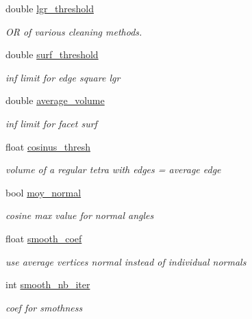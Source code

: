 \begin{DoxyCompactItemize}
\item 
double \hyperlink{classTrParams_a72377e94872cb7e3ec1bc7936d51dfda}{lgr\_\-threshold}
\begin{DoxyCompactList}\small\item\em OR of various cleaning methods. \item\end{DoxyCompactList}\item 
double \hyperlink{classTrParams_a3c2580990cc2a87aa9fb1d8f495eae84}{surf\_\-threshold}
\begin{DoxyCompactList}\small\item\em inf limit for edge square lgr \item\end{DoxyCompactList}\item 
double \hyperlink{classTrParams_a2e9a95d7e585f11e9574ad6b4863ed79}{average\_\-volume}
\begin{DoxyCompactList}\small\item\em inf limit for facet surf \item\end{DoxyCompactList}\item 
float \hyperlink{classTrParams_a91f70ade0efc499e3d55bfb2143d35c6}{cosinus\_\-thresh}
\begin{DoxyCompactList}\small\item\em volume of a regular tetra with edges = average edge \item\end{DoxyCompactList}\item 
bool \hyperlink{classTrParams_a2ba40154349c0c124ca933439d0575b3}{moy\_\-normal}
\begin{DoxyCompactList}\small\item\em cosine max value for normal angles \item\end{DoxyCompactList}\item 
float \hyperlink{classTrParams_ab950f91fef639ad760b8c6911a36536c}{smooth\_\-coef}
\begin{DoxyCompactList}\small\item\em use average vertices normal instead of individual normals \item\end{DoxyCompactList}\item 
int \hyperlink{classTrParams_a404d1c301dd761f928c4b3688efa90c2}{smooth\_\-nb\_\-iter}
\begin{DoxyCompactList}\small\item\em coef for smothness \item\end{DoxyCompactList}\item 

\end{DoxyCompactItemize}
